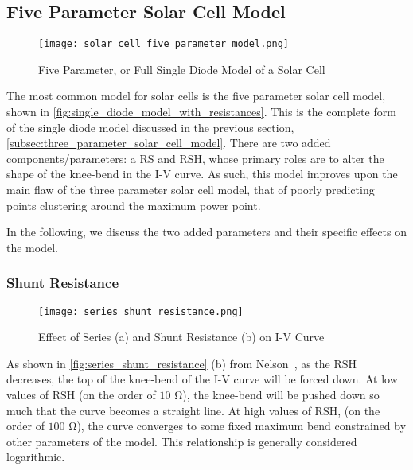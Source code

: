 \subsection{Five Parameter Solar Cell Model}\label{subsec:five_parameter_solar_cell_model}

\begin{figure}[h]
    \texttt{[image: solar\_cell\_five\_parameter\_model.png]}
    \caption{Five Parameter, or Full Single Diode Model of a Solar Cell}
    \label{fig:single_diode_model_with_resistances}
\end{figure}

The most common model for solar cells is the five parameter solar cell model,
shown in \autoref{fig:single_diode_model_with_resistances}. This is the complete
form of the single diode model discussed in the previous section,
\autoref{subsec:three_parameter_solar_cell_model}. There are two added
components/parameters: a \acf{RS} and \acf{RSH}, whose primary roles are to
alter the shape of the knee-bend in the I-V curve. As such, this model improves
upon the main flaw of the three parameter solar cell model, that of poorly
predicting points clustering around the maximum power point.

In the following, we discuss the two added parameters and their specific effects
on the model.


\subsubsection{Shunt Resistance}\label{subsubsec:five_param_shunt_resistance}

\begin{figure}[h]
    \texttt{[image: series\_shunt\_resistance.png]}
    \caption{Effect of Series (a) and Shunt Resistance (b) on \ac{I-V} Curve}
    \label{fig:series_shunt_resistance}
\end{figure}

As shown in \autoref{fig:series_shunt_resistance} (b) from Nelson~\cite{nelson},
as the \acf{RSH} decreases, the top of the knee-bend of the \acf{I-V} curve will
be forced down. At low values of \ac{RSH} (on the order of $10$ $\si{\ohm}$),
the knee-bend will be pushed down so much that the curve becomes a straight
line. At high values of \ac{RSH}, (on the order of $100$ $\si{\ohm}$), the curve
converges to some fixed maximum bend constrained by other parameters of the
model. This relationship is generally considered logarithmic.


